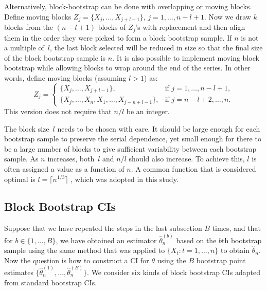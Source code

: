 \documentclass[12pt, letterpaper, titlepage]{article}
\begin{document}
Alternatively, block-bootstrap can be done with overlapping or moving blocks.
Define moving blocks $Z_j = \{X_j, \ldots, X_{j + l - 1}\}$,
$j = 1, \ldots, n - l + 1$. Now we draw $k$ blocks from the $(n - l + 1)$
blocks of $Z_j$'s with replacement and then align them in the order they were
picked to form a block bootstrap sample. If $n$ is not a multiple of~$l$, the
last block selected will be reduced in size so that the final size of the
block bootstrap sample is $n$. It is also possible to implement moving block
bootstrap while allowing blocks to wrap around the end of the series. In other
words, define moving blocks (assuming $l > 1$) as:
\begin{equation}
Z_j =
    \begin{cases}
        \{X_j, \ldots, X_{j + l - 1}\}, & \text{if } j = 1, \dots, n - l + 1,\\
        \{X_j, \ldots, X_n, X_1, \ldots, X_{j-n+l-1}\}, & \text{if } j = n - l
        + 2 ,\dots, n.
    \end{cases}
\end{equation}
This version does not require that $n/l$ be an integer.


The block size~$l$ needs to be chosen with care. It should be large enough for
each bootstrap sample to preserve the serial dependence, yet small enough for
there to be a large number of blocks to give sufficient variability between
each bootstrap sample. As $n$ increases, both~$l$ and $n / l$ should also
increase. To achieve this, $l$ is often assigned a value as a function of $n$.
A common function that is considered optimal is $l = \lceil n^{1/3} \rceil$
\citep{buhlmann1999block}, which was adopted in this study.


\subsection{Block Bootstrap CIs}


Suppose that we have repeated the steps in the last subsection $B$ times, and
that for $b \in \{1, \ldots, B\}$, we have obtained an estimator
$\hat\theta_n^{(b)}$ based on the $b$th bootstrap sample using the same method
that was applied to $\{X_t: t = 1, \ldots, n\}$ to obtain $\hat\theta_n$. Now
the question is how to construct a CI for $\theta$ using the $B$ bootstrap
point estimates $\{\hat\theta_n^{(1)}, \ldots, \hat\theta_n^{(B)}\}$. We
consider six kinds of block bootstrap CIs adapted from standard bootstrap CIs.
\end{document}
